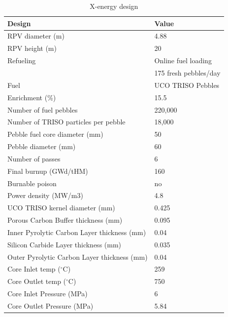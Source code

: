 \begin{table} [ht]
\begin{center}

\caption{ X-energy design}
\label{xtable}
\begin{tabular}{l l}
\hline 
Design 		&Value \\ 
\hline 
RPV diameter (m) 		&4.88 \\ 
RPV height (m) 		&20 \\ 
Refueling		&Online fuel loading  \\ 
	&175 fresh pebbles/day \\ 
Fuel		&UCO TRISO Pebbles \\ 
Enrichment (\%)		&15.5 \\ 
Number of fuel pebbles		&220,000 \\ 
Number of TRISO particles per pebble		&18,000 \\ 
Pebble fuel core diameter (mm)		&50 \\ 
Pebble diameter (mm)	&60 \\ 
Number of passes		&6\\ 
Final burnup (GWd/tHM)		&160 \\ 
Burnable poison		&no \\ 
Power density (MW/m3)		&4.8 \\ 
UCO TRISO kernel diameter (mm)	&0.425 \\ 
Porous Carbon Buffer thickness (mm)	&0.095 \\ 
Inner Pyrolytic Carbon Layer thickness (mm) 	&0.04 \\ 
Silicon Carbide Layer thickness (mm)	&0.035 \\ 
Outer Pyrolytic Carbon Layer thickness (mm)	&0.04 \\ 
Core Inlet temp ($^\circ{}$C)	&259 \\ 
Core Outlet temp ($^\circ{}$C) 	&750 \\ 
Core Inlet Pressure (MPa)	&6 \\ 
Core Outlet Pressure (MPa)	&5.84 \\ 
\hline 

\end{tabular}
\end{center}
\end{table}

